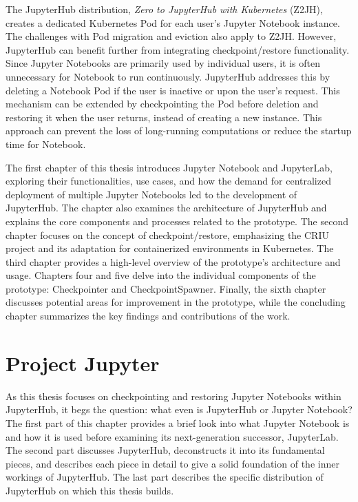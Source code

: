 \documentclass[
  digital,     %
  oneside,     %
  nosansbold,  %
  nocolorbold, %
  lof,         %
  nolot,         %
]{fithesis4}
\begin{document}
The JupyterHub distribution, \emph{Zero to JupyterHub with Kubernetes} (Z2JH), creates a dedicated Kubernetes Pod for each user's Jupyter Notebook instance. The challenges with Pod migration and eviction also apply to Z2JH. However, JupyterHub can benefit further from integrating checkpoint/restore functionality. Since Jupyter Notebooks are primarily used by individual users, it is often unnecessary for Notebook to run continuously. JupyterHub addresses this by deleting a Notebook Pod if the user is inactive or upon the user's request. This mechanism can be extended by checkpointing the Pod before deletion and restoring it when the user returns, instead of creating a new instance. This approach can prevent the loss of long-running computations or reduce the startup time for Notebook.

The first chapter of this thesis introduces Jupyter Notebook and JupyterLab, exploring their functionalities, use cases, and how the demand for centralized deployment of multiple Jupyter Notebooks led to the development of JupyterHub. The chapter also examines the architecture of JupyterHub and explains the core components and processes related to the prototype. The second chapter focuses on the concept of checkpoint/restore, emphasizing the CRIU project and its adaptation for containerized environments in Kubernetes. The third chapter provides a high-level overview of the prototype's architecture and usage. Chapters four and five delve into the individual components of the prototype: Checkpointer and CheckpointSpawner. Finally, the sixth chapter discusses potential areas for improvement in the prototype, while the concluding chapter summarizes the key findings and contributions of the work.

\chapter{Project Jupyter}
As this thesis focuses on checkpointing and restoring Jupyter Notebooks within JupyterHub, it begs the question: what even is JupyterHub or Jupyter Notebook? The first part of this chapter provides a brief look into what Jupyter Notebook is and how it is used before examining its next-generation successor, JupyterLab. The second part discusses JupyterHub, deconstructs it into its fundamental pieces, and describes each piece in detail to give a solid foundation of the inner workings of JupyterHub. The last part describes the specific distribution of JupyterHub on which this thesis builds.
\end{document}
